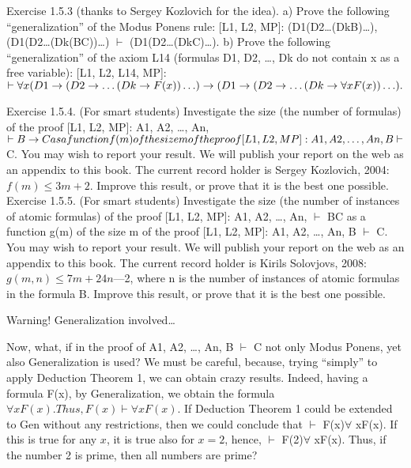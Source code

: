 \begin{exercise}
Exercise 1.5.3 (thanks to Sergey Kozlovich for the idea).
a) Prove the following ``generalization'' of the Modus Ponens rule:
[L1, L2, MP]: (D1\IMPLIES (D2\IMPLIES \ldots (Dk\IMPLIES B)\ldots ), (D1\IMPLIES (D2\IMPLIES \ldots (Dk\IMPLIES (B\IMPLIES C))\ldots ) \(\vdash\) (D1\IMPLIES (D2\IMPLIES \ldots (Dk\IMPLIES C)\ldots ).
b) Prove the following ``generalization'' of the axiom L14 (formulas D1, D2, \ldots , Dk do not contain x as a
free variable):
[L1, L2, L14, MP]: \(\vdash \forall x(D1\rightarrow (D2\rightarrow \ldots (Dk\rightarrow F(x))\ldots ) \rightarrow  (D1\rightarrow (D2\rightarrow \ldots (Dk\rightarrow \forall xF(x))\ldots ).\)
\end{exercise}

\begin{exercise}
Exercise 1.5.4. (For smart students) Investigate the size (the number of formulas) of the proof [L1, L2,
MP]: A1, A2, \ldots , An, \(\vdash B\rightarrow C as a function f(m) of the size m of the proof [L1, L2, MP]: A1, A2, \ldots , An, B \vdash\)
C. You may wish to report your result. We will publish your report on the web as an appendix to this
book. The current record holder is Sergey Kozlovich, 2004: \(f(m) \leq 3m+2\). Improve this result, or prove
that it is the best one possible.
Exercise 1.5.5. (For smart students) Investigate the size (the number of instances of atomic formulas) of
the proof [L1, L2, MP]: A1, A2, \ldots , An, \(\vdash\) B\IMPLIES C as a function g(m) of the size m of the proof [L1, L2, MP]:
A1, A2, \ldots , An, B \(\vdash\) C. You may wish to report your result. We will publish your report on the web as an
appendix to this book. The current record holder is Kirils Solovjovs, 2008: \(g(m, n) \leq 7m+24n\)---2, where n
is the number of instances of atomic formulas in the formula B. Improve this result, or prove that it is the
best one possible.
\end{exercise}

Warning! Generalization involved\ldots 

Now, what, if in the proof of A1, A2, \ldots , An, B \(\vdash\) C not only Modus Ponens, yet also Generalization is used?  We must be careful, because, trying ``simply'' to apply Deduction Theorem 1, we can obtain crazy results.  Indeed, having a formula F(x), by Generalization, we obtain the formula \(\forall xF(x). Thus, F(x) \vdash \forall xF(x)\). If Deduction Theorem 1 could be extended to Gen without any restrictions, then we could conclude that \(\vdash\) F(x)\IMPLIES \(\forall\) xF(x). If this is true for any \(x\), it is true also for \(x=2\), hence, \(\vdash\) F(2)\IMPLIES \(\forall\) xF(x). Thus, if the number 2 is prime, then all numbers are prime?

